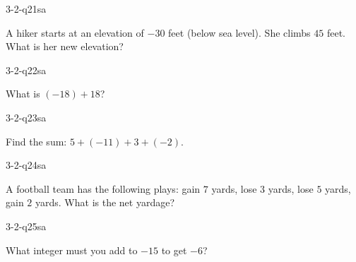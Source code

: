 \begin{practiceQuestion}{3-2-q21}{sa}
\begin{questionText}
A hiker starts at an elevation of $-30$ feet (below sea level). She climbs $45$ feet. What is her new elevation?
\end{questionText}
\end{practiceQuestion}

\begin{practiceQuestion}{3-2-q22}{sa}
\begin{questionText}
What is $(-18) + 18$?
\end{questionText}
\end{practiceQuestion}

\begin{practiceQuestion}{3-2-q23}{sa}
\begin{questionText}
Find the sum: $5 + (-11) + 3 + (-2)$.
\end{questionText}
\end{practiceQuestion}

\begin{practiceQuestion}{3-2-q24}{sa}
\begin{questionText}
A football team has the following plays: gain $7$ yards, lose $3$ yards, lose $5$ yards, gain $2$ yards. What is the net yardage?
\end{questionText}
\end{practiceQuestion}

\begin{practiceQuestion}{3-2-q25}{sa}
\begin{questionText}
What integer must you add to $-15$ to get $-6$?
\end{questionText}
\end{practiceQuestion}


